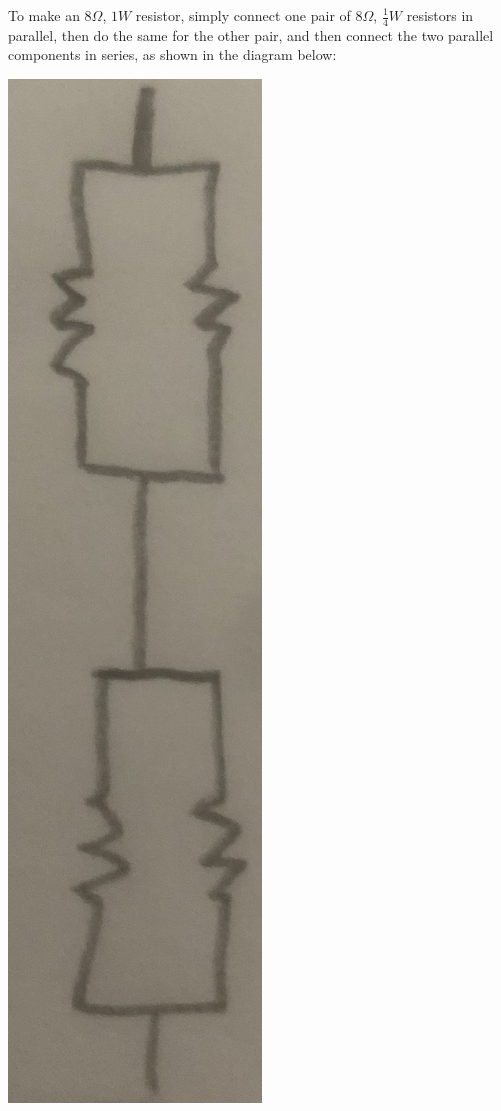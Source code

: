 \documentclass{article}
\begin{document}
\pagecolor{black}
\color{white}


    To make an $8\Omega$, $1W$ resistor, simply connect one pair of $8\Omega$, $\frac14W$ resistors in parallel, then do the same for the other pair, and then connect the two parallel components in series, as shown in the diagram below:

    \begin{center}
    \includegraphics[angle=90,scale=.1]{resistors.jpg}
    \end{center}
\end{document}
